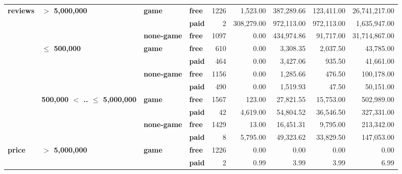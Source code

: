 \begin{tabular}{llll|rrrrr}
\cline{1-9}
\cline{2-9}
\cline{3-9}
\multirow{11}{*}{\textbf{reviews}} & \multirow{3}{*}{\textbf{$>$ 5,000,000}} & \multirow{2}{*}{\textbf{game}} & \textbf{free} &   1226 &   1,523.00 & 387,289.66 & 123,411.00 & 26,741,217.00 \\
      &                                 &           & \textbf{paid} &      2 & 308,279.00 & 972,113.00 & 972,113.00 &  1,635,947.00 \\
\cline{3-9}
      &                                 & \textbf{none-game} & \textbf{free} &   1097 &       0.00 & 434,974.86 &  91,717.00 & 31,714,867.00 \\
\cline{2-9}
      & \multirow{4}{*}{\textbf{$\leq$ 500,000}} & \multirow{2}{*}{\textbf{game}} & \textbf{free} &    610 &       0.00 &   3,308.35 &   2,037.50 &     43,785.00 \\
      &                                 &           & \textbf{paid} &    464 &       0.00 &   3,427.06 &     935.50 &     41,661.00 \\
\cline{3-9}
      &                                 & \multirow{2}{*}{\textbf{none-game}} & \textbf{free} &   1156 &       0.00 &   1,285.66 &     476.50 &    100,178.00 \\
      &                                 &           & \textbf{paid} &    490 &       0.00 &   1,519.93 &      47.50 &     50,151.00 \\
\cline{2-9}
\cline{3-9}
      & \multirow{4}{*}{\textbf{500,000 $<$ .. $\leq$ 5,000,000}} & \multirow{2}{*}{\textbf{game}} & \textbf{free} &   1567 &     123.00 &  27,821.55 &  15,753.00 &    502,989.00 \\
      &                                 &           & \textbf{paid} &     42 &   4,619.00 &  54,804.52 &  36,546.50 &    327,331.00 \\
\cline{3-9}
      &                                 & \multirow{2}{*}{\textbf{none-game}} & \textbf{free} &   1429 &      13.00 &  16,451.31 &   9,795.00 &    213,342.00 \\
      &                                 &           & \textbf{paid} &      8 &   5,795.00 &  49,323.62 &  33,829.50 &    147,053.00 \\
\cline{1-9}
\cline{2-9}
\cline{3-9}
\multirow{11}{*}{\textbf{price}} & \multirow{3}{*}{\textbf{$>$ 5,000,000}} & \multirow{2}{*}{\textbf{game}} & \textbf{free} &   1226 &       0.00 &       0.00 &       0.00 &          0.00 \\
      &                                 &           & \textbf{paid} &      2 &       0.99 &       3.99 &       3.99 &          6.99 \\

\end{tabular}
